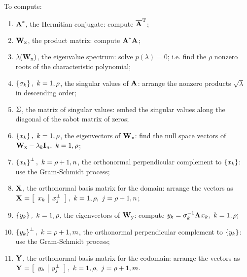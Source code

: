 \begin{landscape}
To compute:
\begin{enumerate}
\item $\A{*}$, the Hermitian conjugate: compute $\overline{\A{}}^{\mathrm{T}}$;
\item $\W{x}$, the product matrix: compute $\prdm{*}$;
\item $\lambda(\W{x})$, the eigenvalue spectrum: solve $p(\lambda)=0$; i.e. find the $\rho$ nonzero roots of the characteristic polynomial;
\item $\lst{\sigma_{k}}, \  k=1,\rho$, the singular values of $\A{}$: arrange the nonzero products $\sqrt{\lambda}$ in descending order;
\item $\sig{}$, the matrix of singular values: embed the singular values along the diagonal of the sabot matrix of zeros;
\item $\lst{x_{k}},\  k=1,\rho$, the eigenvectors of $\W{x}$: find the null space vectors of $\W{x}-\lambda_{k}\I{n},\  k=1,\rho$;
\item $\lst{x_{k}}^{\perp},\  k=\rho+1,n$, the orthonormal perpendicular complement to $\lst{x_{k}}$: use the Gram-Schmidt process;
\item $\X{}$, the orthonormal basis matrix for the domain: arrange the vectors as $\X{}=\mat{c|c}{x_{k} & x^{\perp}_{j}}, \  k=1,\rho, \ j = \rho+1,n$;
\item $\lst{y_{k}},\  k=1,\rho$, the eigenvectors of $\W{y}$: compute $y_{k} = \sigma_{k}^{-1}\A{}x_{k},\  k=1,\rho;$
\item $\lst{y_{k}}^{\perp},\  k=\rho+1,m$, the orthonormal perpendicular complement to $\lst{y_{k}}$: use the Gram-Schmidt process;
\item $\Y{}$, the orthonormal basis matrix for the codomain: arrange the vectors as $\Y{}=\mat{c|c}{y_{k} & y^{\perp}_{j}}, \  k=1,\rho, \ j = \rho+1,m$.
\end{enumerate}

\clearpage
\thispagestyle{empty}


\end{landscape}
